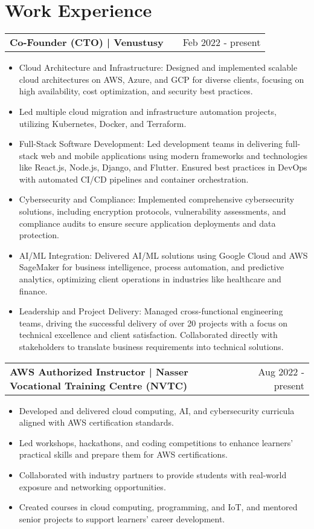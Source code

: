 \documentclass[a4paper,11pt]{article}
\makeatletter
\newenvironment{joblong}[2]
    {
    \begin{tabularx}{\linewidth}{@{}l X r@{}}
    \textbf{#1} & \hfill &  #2 \\[3.75pt]
    \end{tabularx}
    \begin{minipage}[t]{\linewidth}
    \begin{itemize}[nosep,after=\strut, leftmargin=1em, itemsep=3pt,label=--]
    }
    {
    \end{itemize}
    \end{minipage}    
    }
\makeatother
\begin{document}
\section{Work Experience}

\begin{joblong}{Co-Founder (CTO) | Venustusy}{Feb 2022 - present}
\item Cloud Architecture and Infrastructure: Designed and implemented scalable cloud architectures on AWS, Azure, and GCP for diverse clients, focusing on high availability, cost optimization, and security best practices. 
\item Led multiple cloud migration and infrastructure automation projects, utilizing Kubernetes, Docker, and Terraform.
\item Full-Stack Software Development: Led development teams in delivering full-stack web and mobile applications using modern frameworks and technologies like React.js, Node.js, Django, and Flutter. Ensured best practices in DevOps with automated CI/CD pipelines and container orchestration.
\item Cybersecurity and Compliance: Implemented comprehensive cybersecurity solutions, including encryption protocols, vulnerability assessments, and compliance audits to ensure secure application deployments and data protection.
\item AI/ML Integration: Delivered AI/ML solutions using Google Cloud and AWS SageMaker for business intelligence, process automation, and predictive analytics, optimizing client operations in industries like healthcare and finance.
\item Leadership and Project Delivery: Managed cross-functional engineering teams, driving the successful delivery of over 20 projects with a focus on technical excellence and client satisfaction. Collaborated directly with stakeholders to translate business requirements into technical solutions.
\end{joblong}


\begin{joblong}{AWS Authorized Instructor | Nasser Vocational Training Centre (NVTC)}{Aug 2022 - present}
\item Developed and delivered cloud computing, AI, and cybersecurity curricula aligned with AWS certification standards.
\item Led workshops, hackathons, and coding competitions to enhance learners' practical skills and prepare them for AWS certifications.
\item Collaborated with industry partners to provide students with real-world exposure and networking opportunities.
\item Created courses in cloud computing, programming, and IoT, and mentored senior projects to support learners' career development.

\end{joblong}
\end{document}
